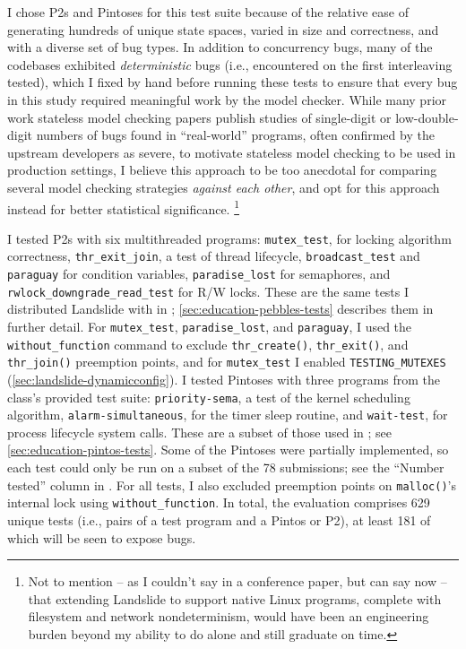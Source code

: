 I chose P2s and Pintoses for this test suite because of the relative ease of generating hundreds of unique state spaces,
varied in size and correctness, and with a diverse set of bug types.
In addition to concurrency bugs,
many of the codebases exhibited {\em deterministic} bugs (i.e., encountered on the first interleaving tested),
which I fixed by hand before running these tests to ensure that every bug in this study required meaningful work by the model checker.
While many prior work stateless model checking papers
publish studies of single-digit or low-double-digit numbers of
bugs found in ``real-world'' programs, often confirmed by the upstream developers as severe,
to motivate stateless model checking to be used in production settings,
I believe this approach to be too anecdotal for comparing several model checking strategies {\em against each other},
and opt for this approach instead for better statistical significance.%
\footnote{Not to mention -- as I couldn't say in a conference paper, but can say now --
that extending Landslide to support native Linux programs,
complete with filesystem and network nondeterminism,
would have been an engineering burden beyond my ability to do alone and still graduate on time.}

\newcommand\mxtest{\texttt{mutex\_test}\xspace}
\newcommand\tej{\texttt{thr\_exit\_join}\xspace}
\newcommand\bct{\texttt{broadcast\_test}\xspace}
\newcommand\paraguay{\texttt{paraguay}\xspace}
\newcommand\paradise{\texttt{paradise\_lost}\xspace}
\newcommand\rwldgr{\texttt{rwlock\_downgrade\_read\_test}\xspace}
\newcommand\prisema{\texttt{priority-sema}\xspace}
\newcommand\waitsimple{\texttt{wait-test}\xspace}
\newcommand\alarmsimul{\texttt{alarm-simultaneous}\xspace}

I tested P2s with six multithreaded programs:
\mxtest, for locking algorithm correctness,
\tej, a test of thread lifecycle,
\bct and \paraguay for condition variables,
\paradise for semaphores,
and \rwldgr for R/W locks.
These are the same tests I distributed Landslide with in ;
\cref{sec:education-pebbles-tests} describes them in further detail.
For \mxtest, \paradise, and \paraguay,
I used the {\tt without\_function} command to exclude
{\tt thr\_create()}, {\tt thr\_exit()}, and {\tt thr\_join()} preemption points,
and for \mxtest I enabled {\tt TESTING\_MUTEXES} (\cref{sec:landslide-dynamicconfig}).
I tested Pintoses with three programs from the class's provided test suite:
\prisema, a test of the kernel scheduling algorithm,
\alarmsimul, for the timer sleep routine,
and \waitsimple, for process lifecycle system calls.
These are a subset of those used in ; see \cref{sec:education-pintos-tests}.
Some of the Pintoses were partially implemented,
so each test could only be run on a subset of the 78 submissions;
see the ``Number tested'' column in .
For all tests,
I also excluded preemption points on {\tt malloc()}'s internal lock using {\tt without\_function}.
In total, the evaluation comprises 629 unique tests (i.e., pairs of a test program and a Pintos or P2),
at least 181 of which will be seen to expose bugs.


